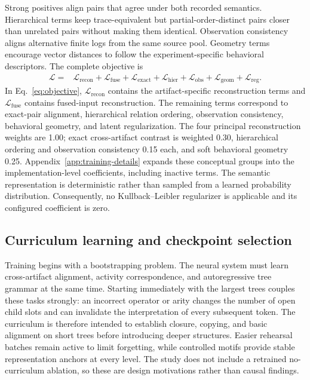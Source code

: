 \documentclass[pdflatex,sn-basic]{sn-jnl}
\begin{document}
Strong positives align pairs that agree under both recorded semantics. Hierarchical terms keep trace-equivalent but partial-order-distinct pairs closer than unrelated pairs without making them identical. Observation consistency aligns alternative finite logs from the same source pool. Geometry terms encourage vector distances to follow the experiment-specific behavioral descriptors. The complete objective is
\begin{align}
\mathcal{L}={}&
 \mathcal{L}_{\mathrm{recon}}
 +\mathcal{L}_{\mathrm{fuse}}
 +\mathcal{L}_{\mathrm{exact}}
 +\mathcal{L}_{\mathrm{hier}}
 +\mathcal{L}_{\mathrm{obs}}
 +\mathcal{L}_{\mathrm{geom}}
 +\mathcal{L}_{\mathrm{reg}}.
\label{eq:objective}
\end{align}
In Eq.~\eqref{eq:objective}, $\mathcal{L}_{\mathrm{recon}}$ contains the artifact-specific reconstruction terms and $\mathcal{L}_{\mathrm{fuse}}$ contains fused-input reconstruction. The remaining terms correspond to exact-pair alignment, hierarchical relation ordering, observation consistency, behavioral geometry, and latent regularization. The four principal reconstruction weights are 1.00; exact cross-artifact contrast is weighted 0.30, hierarchical ordering and observation consistency 0.15 each, and soft behavioral geometry 0.25. Appendix~\ref{app:training-details} expands these conceptual groups into the implementation-level coefficients, including inactive terms. The semantic representation is deterministic rather than sampled from a learned probability distribution. Consequently, no Kullback--Leibler regularizer is applicable and its configured coefficient is zero.

\subsection{Curriculum learning and checkpoint selection}\label{sec:curriculum}

Training begins with a bootstrapping problem. The neural system must learn cross-artifact alignment, activity correspondence, and autoregressive tree grammar at the same time. Starting immediately with the largest trees couples these tasks strongly: an incorrect operator or arity changes the number of open child slots and can invalidate the interpretation of every subsequent token. The curriculum is therefore intended to establish closure, copying, and basic alignment on short trees before introducing deeper structures. Easier rehearsal batches remain active to limit forgetting, while controlled motifs provide stable representation anchors at every level. The study does not include a retrained no-curriculum ablation, so these are design motivations rather than causal findings.
\end{document}
